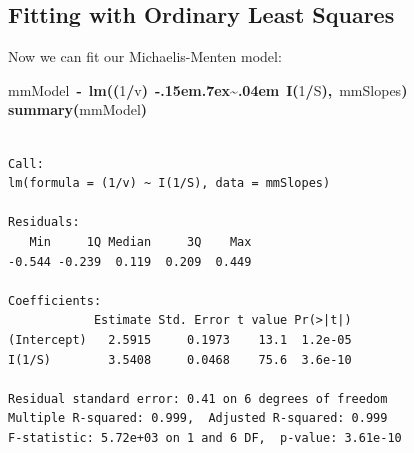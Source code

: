 \documentclass{article}
\makeatletter
\newcommand{\hlnumber}[1]{\textcolor[rgb]{0,0,0}{#1}}%
\newcommand{\hlfunctioncall}[1]{\textcolor[rgb]{0.501960784313725,0,0.329411764705882}{\textbf{#1}}}%
\newcommand{\hlkeyword}[1]{\textcolor[rgb]{0,0,0}{\textbf{#1}}}%
\newcommand{\hlassignement}[1]{\textcolor[rgb]{0,0,0}{\textbf{#1}}}%
\newcommand{\hlsymbol}[1]{\textcolor[rgb]{0,0,0}{#1}}%
\def\urltilda{\kern -.15em\lower .7ex\hbox{\~{}}\kern .04em}%
\newcommand{\hlstd}[1]{\textcolor[rgb]{0,0,0}{#1}}%
\newenvironment{kframe}{%
 \def\FrameCommand##1{\hskip\@totalleftmargin \hskip-\fboxsep
 \colorbox{shadecolor}{##1}\hskip-\fboxsep
     \hskip-\linewidth \hskip-\@totalleftmargin \hskip\columnwidth}%
 \MakeFramed {\advance\hsize-\width
   \@totalleftmargin\z@ \linewidth\hsize
   \@setminipage}}%
 {\par\unskip\endMakeFramed}
\newenvironment{knitrout}{}{} %
\makeatother
\begin{document}
\subsection{Fitting with Ordinary Least Squares}
Now we can fit our Michaelis-Menten model:
\begin{knitrout}
\color{fgcolor}\begin{kframe}
\begin{flushleft}
\ttfamily\noindent
\hlsymbol{mmModel}{\ }\hlassignement{\usebox{\hlnormalsizeboxlessthan}-}{\ }\hlfunctioncall{lm}\hlkeyword{(}\hlkeyword{(}\hlnumber{1}\hlkeyword{/}\hlsymbol{v}\hlkeyword{)}{\ }\hlkeyword{\urltilda{}}{\ }\hlfunctioncall{I}\hlkeyword{(}\hlnumber{1}\hlkeyword{/}\hlsymbol{S}\hlkeyword{)}\hlkeyword{,}{\ }\hlsymbol{mmSlopes}\hlkeyword{)}\hspace*{\fill}\\
\hlstd{}\hlfunctioncall{summary}\hlkeyword{(}\hlsymbol{mmModel}\hlkeyword{)}\mbox{}
\normalfont
\end{flushleft}
\begin{verbatim}

Call:
lm(formula = (1/v) ~ I(1/S), data = mmSlopes)

Residuals:
   Min     1Q Median     3Q    Max 
-0.544 -0.239  0.119  0.209  0.449 

Coefficients:
            Estimate Std. Error t value Pr(>|t|)
(Intercept)   2.5915     0.1973    13.1  1.2e-05
I(1/S)        3.5408     0.0468    75.6  3.6e-10

Residual standard error: 0.41 on 6 degrees of freedom
Multiple R-squared: 0.999,	Adjusted R-squared: 0.999 
F-statistic: 5.72e+03 on 1 and 6 DF,  p-value: 3.61e-10 


\end{verbatim}
\end{kframe}
\end{knitrout}
\end{document}
